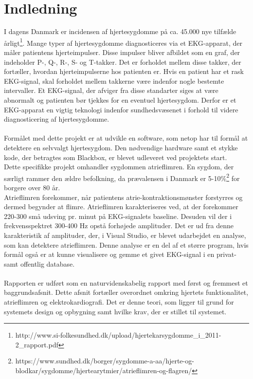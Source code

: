 \chapter{Indledning}
I dagens Danmark er incidensen af hjertesygdomme på ca. 45.000 nye tilfælde årligt\footnote{http://www.si-folkesundhed.dk/upload/hjertekarsygdomme\_i\_2011-2\_rapport.pdf}. Mange typer af hjertesygdomme diagnosticeres via et EKG-apparat, der måler patientens hjerteimpulser. Disse impulser bliver afbildet som en graf, der indeholder P-, Q-, R-, S- og T-takker. Det er forholdet mellem disse takker, der fortæller, hvordan hjerteimpulserne hos patienten er. Hvis en patient har et rask EKG-signal, skal forholdet mellem takkerne være indenfor nogle bestemte intervaller. Et EKG-signal, der afviger fra disse standarter siges at være abnormalt og patienten bør tjekkes for en eventuel hjertesygdom. Derfor er et EKG-apparat en vigtig teknologi indenfor sundhedsvæsenet i forhold til videre diagnosticering af hjertesygdomme.\\ \\
Formålet med dette projekt er at udvikle en software, som netop har til formål at detektere en selvvalgt hjertesygdom. Den nødvendige hardware samt et stykke kode, der betragtes som Blackbox, er blevet udleveret ved projektets start.\\
Dette specifikke projekt omhandler sygdommen atrieflimren. En sygdom, der særligt rammer den ældre befolkning, da prævalensen i Danmark er 5-10\%\footnote{https://www.sundhed.dk/borger/sygdomme-a-aa/hjerte-og-blodkar/sygdomme/hjertearytmier/atrieflimren-og-flagren/} for borgere over 80 år.\\
Atrieflimren forekommer, når patientens atrie-kontraktionsmønster forstyrres og dermed begynder at flimre. Atrieflimren karakteriseres ved, at der forekommer 220-300 små udsving pr. minut på EKG-signalets baseline. Desuden vil der i frekvensspektret 300-400 Hz opstå forhøjede amplituder. Det er ud fra denne karakteristik af amplituder, der, i Visual Studio, er blevet udarbejdet en analyse, som kan detektere atrieflimren. Denne analyse er en del af et større program, hvis formål også er at kunne visualisere og gemme et givet EKG-signal i en privat- samt offentlig database. \\ \\
Rapporten er udført som en naturvidenskabelig rapport med først og fremmest et baggrundsafsnit. Dette afsnit fortæller overordnet omkring hjertets funktionalitet, atrieflimren og elektrokardiografi. Det er denne teori, som ligger til grund for systemets design og opbygning samt hvilke krav, der er stillet til systemet.
  
